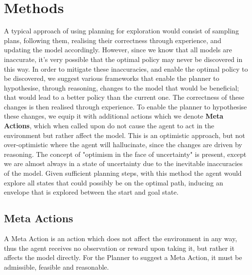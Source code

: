 \chapter{Methods}
\label{chapter4}
A typical approach of using planning for exploration would consist of sampling plans, following them, realising their correctness through experience, and updating the model accordingly. However, since we know that all models are inaccurate, it's very possible that the optimal policy may never be discovered in this way. In order to mitigate these inaccuracies, and enable the optimal policy to be discovered, we suggest various frameworks that enable the planner to hypothesise, through reasoning, changes to the model that would be beneficial; that would lead to a better policy than the current one. The correctness of these changes is then realised through experience. To enable the planner to hypothesise these changes, we equip it with additional actions which we denote \textbf{Meta Actions}, which when called upon do not cause the agent to act in the environment but rather affect the model. This is an optimistic approach, but not over-optimistic where the agent will hallucinate, since the changes are driven by reasoning. The concept of "optimism in the face of uncertainty" is present, except we are almost always in a state of uncertainty due to the inevitable inaccuracies of the model. Given sufficient planning steps, with this method the agent would explore all states that could possibly be on the optimal path, inducing an envelope that is explored between the start and goal state.
\section{Meta Actions}
A Meta Action is an action which does not affect the environment in any way, thus the agent receives no observation or reward upon taking it, but rather it affects the model directly. For the Planner to suggest a Meta Action, it must be admissible, feasible and reasonable.
